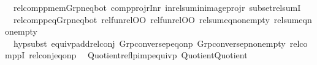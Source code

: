 \begin{isabellebody}
\ \ relcompp{\isacharunderscore}{\kern0pt}mem{\isacharunderscore}{\kern0pt}Grp{\isacharunderscore}{\kern0pt}neq{\isacharunderscore}{\kern0pt}bot\ comp{\isacharunderscore}{\kern0pt}projr{\isacharunderscore}{\kern0pt}Inr\ in{\isacharunderscore}{\kern0pt}rel{\isacharunderscore}{\kern0pt}sum{\isacharunderscore}{\kern0pt}in{\isacharunderscore}{\kern0pt}image{\isacharunderscore}{\kern0pt}projr\ subset{\isacharunderscore}{\kern0pt}rel{\isacharunderscore}{\kern0pt}sumI\isanewline
\ \ relcompp{\isacharunderscore}{\kern0pt}eq{\isacharunderscore}{\kern0pt}Grp{\isacharunderscore}{\kern0pt}neq{\isacharunderscore}{\kern0pt}bot\ rel{\isacharunderscore}{\kern0pt}fun{\isacharunderscore}{\kern0pt}rel{\isacharunderscore}{\kern0pt}OO{}\ rel{\isacharunderscore}{\kern0pt}fun{\isacharunderscore}{\kern0pt}rel{\isacharunderscore}{\kern0pt}OO{}\ rel{\isacharunderscore}{\kern0pt}sum{\isacharunderscore}{\kern0pt}eq{}{\isacharunderscore}{\kern0pt}nonempty\ rel{\isacharunderscore}{\kern0pt}sum{\isacharunderscore}{\kern0pt}eq{}{\isacharunderscore}{\kern0pt}nonempty\isanewline
\ \ hypsubst\ equivp{\isacharunderscore}{\kern0pt}add{\isacharunderscore}{\kern0pt}relconj\ Grp{\isacharunderscore}{\kern0pt}conversep{\isacharunderscore}{\kern0pt}eq{\isacharunderscore}{\kern0pt}onp\ Grp{\isacharunderscore}{\kern0pt}conversep{\isacharunderscore}{\kern0pt}nonempty\ relcomppI{}\ rel{\isacharunderscore}{\kern0pt}conj{\isacharunderscore}{\kern0pt}eq{\isacharunderscore}{\kern0pt}onp\isanewline
\ \ Quotient{\isacharunderscore}{\kern0pt}reflp{\isacharunderscore}{\kern0pt}imp{\isacharunderscore}{\kern0pt}equivp\ Quotient{\isacharunderscore}{\kern0pt}Quotient{}\isanewline
%
\isadelimtheory
\isanewline
%
\endisadelimtheory
%
\isatagtheory
{}\isamarkupfalse%
%
\endisatagtheory
{\isafoldtheory}%
%
\isadelimtheory
%
\endisadelimtheory
%
\end{isabellebody}%
\endinput
